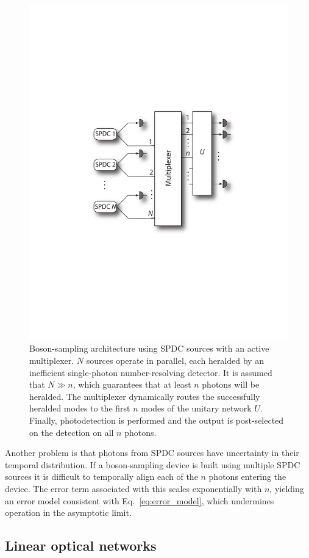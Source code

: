 \documentclass[aps,pra,twocolumn,amsmath,amssymb,nofootinbib,superscriptaddress]{revtex4}
\begin{document}
\begin{figure}[!htb]
\includegraphics[width=0.7\columnwidth]{multiplexing}
\caption{Boson-sampling architecture using SPDC sources with an active multiplexer. $N$ sources operate in parallel, each heralded by an inefficient single-photon number-resolving detector. It is assumed that \mbox{$N\gg n$}, which guarantees that at least $n$ photons will be heralded. The multiplexer dynamically routes the successfully heralded modes to the first $n$ modes of the unitary network $U$. Finally, photodetection is performed and the output is post-selected on the detection on all $n$ photons.}
\label{fig:multiplexing}
\end{figure}

Another problem is that photons from SPDC sources have uncertainty in their temporal distribution. If a boson-sampling device is built using multiple SPDC sources it is difficult to temporally align each of the $n$ photons entering the device. The error term associated with this scales exponentially with $n$, yielding an error model consistent with Eq.~\ref{eq:error_model}, which undermines operation in the asymptotic limit. 

\subsection{Linear optical networks}
\end{document}
